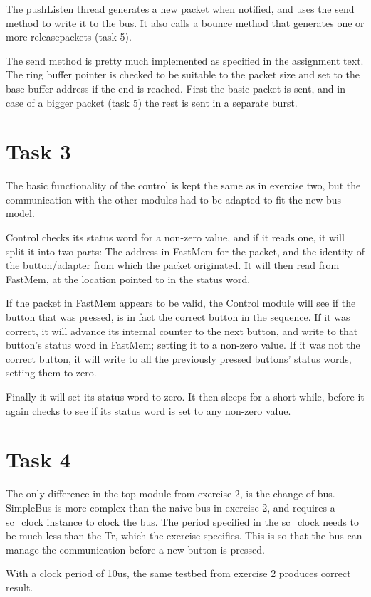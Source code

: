 \documentclass[11pt]{report}
\begin{document}
The pushListen thread generates a new packet when notified, and uses the send
method to write it to the bus. It also calls a bounce method that generates 
one or more releasepackets (task 5).

The send method is pretty much implemented as specified in the assignment text.
The ring buffer pointer is checked to be suitable to the packet size and set to 
the base buffer address if the end is reached. First the basic packet is sent, 
and in case of a bigger packet (task 5) the rest is sent in a separate burst.

\section*{Task 3}
The basic functionality of the control is kept the same as in exercise two, but
the communication with the other modules had to be adapted to fit the new bus
model.

Control checks its status word for a non-zero value, and if it reads one, it
will split it into two parts: The address in FastMem for the packet, and the
identity of the button/adapter from which the packet originated. It will then
read from FastMem, at the location pointed to in the status word.

If the packet in FastMem appears to be valid, the Control module will see if
the button that was pressed, is in fact the correct button in the sequence. If
it was correct, it will advance its internal counter to the next button, and
write to that button's status word in FastMem; setting it to a non-zero value.
If it was not the correct button, it will write to all the previously pressed
buttons' status words, setting them to zero.

Finally it will set its status word to zero. It then sleeps for a short 
while, before it again checks to see if its status word is set to any non-zero 
value.

\section*{Task 4}
The only difference in the top module from exercise 2, is the change of bus.
SimpleBus is more complex than the naive bus in exercise 2, and requires a
sc\_clock instance to clock the bus. The period specified in the sc\_clock needs
to be much less than the Tr, which the exercise specifies. This is so that the
bus can manage the communication before a new button is pressed.

With a clock period of 10us, the same testbed from exercise 2 produces
correct result. 
\end{document}

